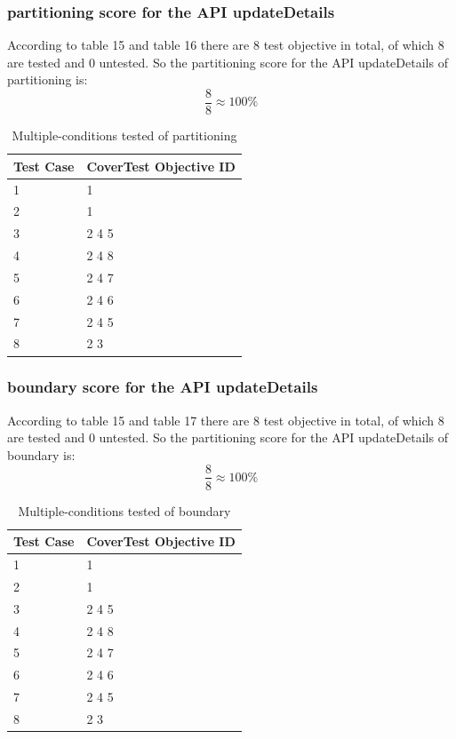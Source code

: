 \documentclass{article}
\begin{document}
\subsubsection{partitioning score for the API updateDetails}
According to table 15 and table 16 there are 8 test objective in total, of which 8 are tested and 0 untested. So the partitioning score for the API updateDetails of partitioning is:
$$\frac{8}{8}\approx100\%$$
\begin{longtable}{|p{2cm}|p{8cm}|}
\caption{Multiple-conditions tested of partitioning}\\
\hline 
Test Case& CoverTest Objective ID\\
\hline  
1&1\\
\hline
2&1\\
\hline
3&2 4 5\\
\hline
4&2 4 8\\
\hline
5&2 4 7\\
\hline
6&2 4 6\\
\hline
7&2 4 5\\
\hline
8&2 3\\
\hline
\end{longtable}

\subsubsection{boundary score for the API updateDetails}
According to table 15 and table 17 there are 8 test objective in total, of which 8 are tested and 0 untested. So the partitioning score for the API updateDetails of boundary is:
$$\frac{8}{8}\approx100\%$$
\begin{longtable}{|p{2cm}|p{8cm}|}
\caption{Multiple-conditions tested of boundary}\\
\hline 
Test Case& CoverTest Objective ID\\
\hline  
1&1\\
\hline
2&1\\
\hline
3&2 4 5\\
\hline
4&2 4 8\\
\hline
5&2 4 7\\
\hline
6&2 4 6\\
\hline
7&2 4 5\\
\hline
8&2 3\\
\hline
\end{longtable}

\end{document}
